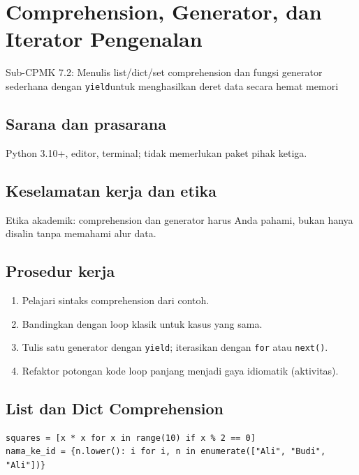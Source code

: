 \documentclass[../main.tex]{subfiles}
\begin{document}
\chapter{Comprehension, Generator, dan Iterator Pengenalan}

\begin{subcpmk}
  \item Sub-CPMK 7.2: Menulis list/dict/set comprehension dan fungsi generator sederhana dengan \texttt{yield}\newline untuk menghasilkan deret data secara hemat memori
\end{subcpmk}


\section{Sarana dan prasarana}

Python 3.10+, editor, terminal; tidak memerlukan paket pihak ketiga.

\section{Keselamatan kerja dan etika}

Etika akademik: comprehension dan generator harus Anda pahami, bukan hanya disalin tanpa memahami alur data.

\section{Prosedur kerja}

\begin{enumerate}[leftmargin=*]
  \item Pelajari sintaks comprehension dari contoh.
  \item Bandingkan dengan loop klasik untuk kasus yang sama.
  \item Tulis satu generator dengan \texttt{yield}; iterasikan dengan \texttt{for} atau \texttt{next()}.
  \item Refaktor potongan kode loop panjang menjadi gaya idiomatik (aktivitas).
\end{enumerate}

\section{List dan Dict Comprehension}

\begin{lstlisting}[caption=Comprehension]
squares = [x * x for x in range(10) if x % 2 == 0]
nama_ke_id = {n.lower(): i for i, n in enumerate(["Ali", "Budi", "Ali"])}
\end{lstlisting}
\end{document}

